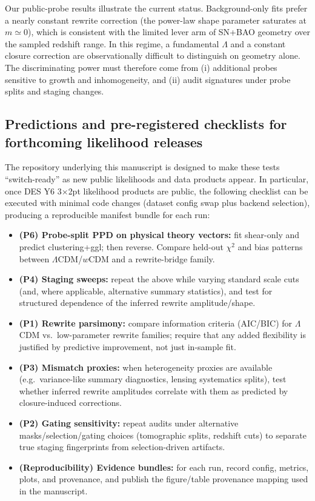\documentclass[11pt]{article}
\theoremstyle{definition}
\theoremstyle{plain}
\theoremstyle{remark}
\begin{document}
Our public-probe results illustrate the current status. Background-only fits prefer a nearly constant rewrite correction (the power-law shape parameter saturates at $m\simeq 0$), which is consistent with the limited lever arm of SN+BAO geometry over the sampled redshift range. In this regime, a fundamental $\Lambda$ and a constant closure correction are observationally difficult to distinguish on geometry alone. The discriminating power must therefore come from (i) additional probes sensitive to growth and inhomogeneity, and (ii) audit signatures under probe splits and staging changes.

\subsection{Predictions and pre-registered checklists for forthcoming likelihood releases}\label{sec:discussion:predictions}
The repository underlying this manuscript is designed to make these tests ``switch-ready'' as new public likelihoods and data products appear. In particular, once DES Y6 3$\times$2pt likelihood products are public, the following checklist can be executed with minimal code changes (dataset config swap plus backend selection), producing a reproducible manifest bundle for each run:

\begin{itemize}
  \item \textbf{(P6) Probe-split PPD on physical theory vectors:} fit shear-only and predict clustering+ggl; then reverse. Compare held-out $\chi^2$ and bias patterns between $\Lambda$CDM/$w$CDM and a rewrite-bridge family.
  \item \textbf{(P4) Staging sweeps:} repeat the above while varying standard scale cuts (and, where applicable, alternative summary statistics), and test for structured dependence of the inferred rewrite amplitude/shape.
  \item \textbf{(P1) Rewrite parsimony:} compare information criteria (AIC/BIC) for $\Lambda$CDM vs.\ low-parameter rewrite families; require that any added flexibility is justified by predictive improvement, not just in-sample fit.
  \item \textbf{(P3) Mismatch proxies:} when heterogeneity proxies are available (e.g.\ variance-like summary diagnostics, lensing systematics splits), test whether inferred rewrite amplitudes correlate with them as predicted by closure-induced corrections.
  \item \textbf{(P2) Gating sensitivity:} repeat audits under alternative masks/selection/gating choices (tomographic splits, redshift cuts) to separate true staging fingerprints from selection-driven artifacts.
  \item \textbf{(Reproducibility) Evidence bundles:} for each run, record config, metrics, plots, and provenance, and publish the figure/table provenance mapping used in the manuscript.
\end{itemize}
\end{document}
